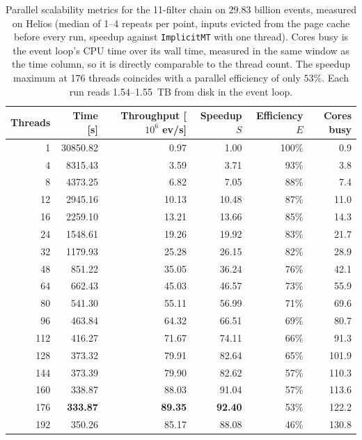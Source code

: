 \begin{table}[htbp]
\centering
\caption{Parallel scalability metrics for the 11-filter chain on $29.83$ billion events, measured on Helios (median of 1--4 repeats per point, inputs evicted from the page cache before every run, speedup against \texttt{ImplicitMT} with one thread). Cores busy is the event loop's CPU time over its wall time, measured in the same window as the time column, so it is directly comparable to the thread count. The speedup maximum at 176 threads coincides with a parallel efficiency of only $53\%$. Each run reads 1.54--1.55~TB from disk in the event loop.}
\label{tab:scalability-chain11}
\begin{tabular}{rrrrrr}
\toprule
Threads & Time [s] & Throughput [$10^6$ ev/s] & Speedup $S$ & Efficiency $E$ & Cores busy \\
\midrule
 1 & 30850.82 & 0.97 & 1.00 & 100\% & 0.9 \\
 4 & 8315.43 & 3.59 & 3.71 & 93\% & 3.8 \\
 8 & 4373.25 & 6.82 & 7.05 & 88\% & 7.4 \\
12 & 2945.16 & 10.13 & 10.48 & 87\% & 11.0 \\
16 & 2259.10 & 13.21 & 13.66 & 85\% & 14.3 \\
24 & 1548.61 & 19.26 & 19.92 & 83\% & 21.7 \\
32 & 1179.93 & 25.28 & 26.15 & 82\% & 28.9 \\
48 & 851.22 & 35.05 & 36.24 & 76\% & 42.1 \\
64 & 662.43 & 45.03 & 46.57 & 73\% & 55.9 \\
80 & 541.30 & 55.11 & 56.99 & 71\% & 69.6 \\
96 & 463.84 & 64.32 & 66.51 & 69\% & 80.7 \\
112 & 416.27 & 71.67 & 74.11 & 66\% & 91.3 \\
128 & 373.32 & 79.91 & 82.64 & 65\% & 101.9 \\
144 & 373.39 & 79.90 & 82.62 & 57\% & 110.3 \\
160 & 338.87 & 88.03 & 91.04 & 57\% & 113.6 \\
176 & \textbf{333.87} & \textbf{89.35} & \textbf{92.40} & 53\% & 122.2 \\
192 & 350.26 & 85.17 & 88.08 & 46\% & 130.8 \\
\bottomrule
\end{tabular}
\end{table}
